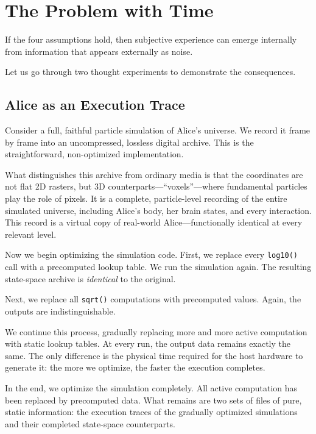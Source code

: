 \chapter{The Problem with Time}
\label{chap:the-problem-with-time}

If the four assumptions hold, then subjective experience can emerge internally from information that appears externally as noise.

Let us go through two thought experiments to demonstrate the consequences.

\section{Alice as an Execution Trace}

Consider a full, faithful particle simulation of Alice's universe. 
We record it frame by frame into an uncompressed, lossless digital archive. 
This is the straightforward, non-optimized implementation.

What distinguishes this archive from ordinary media is that the coordinates are not flat 2D rasters,
but 3D counterparts---``voxels''---where fundamental particles play the role of pixels. 
It is a complete, particle-level recording of the entire simulated universe, including Alice's body, her brain states, and every interaction. 
This record is a virtual copy of real-world Alice---functionally identical at every relevant level.

Now we begin optimizing the simulation code. 
First, we replace every \texttt{log10()} call with a precomputed lookup table. 
We run the simulation again. The resulting state-space archive is \emph{identical} to the original.

Next, we replace all \texttt{sqrt()} computations with precomputed values. 
Again, the outputs are indistinguishable.

We continue this process, gradually replacing more and more active computation with static lookup tables. 
At every run, the output data remains exactly the same. The only difference is the physical time required
for the host hardware to generate it: the more we optimize, the faster the execution completes.

In the end, we optimize the simulation completely. 
All active computation has been replaced by precomputed data. What remains are two sets of files of pure, static information: the execution traces of the gradually optimized simulations and their completed state-space counterparts.

